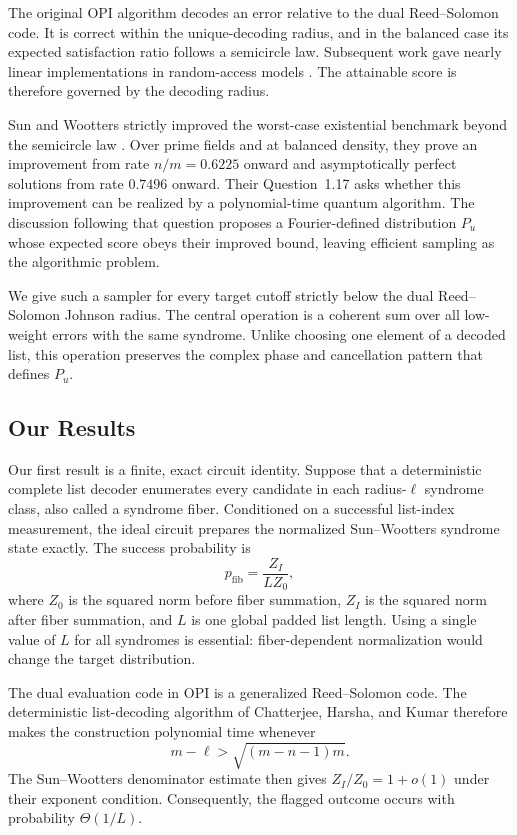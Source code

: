 \documentclass[11pt,letterpaper]{article}
\theoremstyle{definition}
\begin{document}
The original OPI algorithm decodes an error relative to the dual Reed--Solomon code.  It is correct within the unique-decoding radius, and in the balanced case its expected satisfaction ratio follows a semicircle law.  Subsequent work gave nearly linear implementations in random-access models \cite{KhattarEtAl2025,Rosmanis2026}.  The attainable score is therefore governed by the decoding radius.

Sun and Wootters strictly improved the worst-case existential benchmark beyond the semicircle law \cite{SunWootters2026}.  Over prime fields and at balanced density, they prove an improvement from rate $n/m=0.6225$ onward and asymptotically perfect solutions from rate $0.7496$ onward.  Their Question~1.17 asks whether this improvement can be realized by a polynomial-time quantum algorithm.  The discussion following that question proposes a Fourier-defined distribution $P_u$ whose expected score obeys their improved bound, leaving efficient sampling as the algorithmic problem.

We give such a sampler for every target cutoff strictly below the dual Reed--Solomon Johnson radius.  The central operation is a coherent sum over all low-weight errors with the same syndrome.  Unlike choosing one element of a decoded list, this operation preserves the complex phase and cancellation pattern that defines $P_u$.

\subsection{Our Results}

Our first result is a finite, exact circuit identity.  Suppose that a deterministic complete list decoder enumerates every candidate in each radius-$\ell$ syndrome class, also called a syndrome fiber.  Conditioned on a successful list-index measurement, the ideal circuit prepares the normalized Sun--Wootters syndrome state exactly.  The success probability is
\[
   p_{\mathrm{fib}}=\frac{Z_I}{LZ_0},
\]
where $Z_0$ is the squared norm before fiber summation, $Z_I$ is the squared norm after fiber summation, and $L$ is one global padded list length.  Using a single value of $L$ for all syndromes is essential: fiber-dependent normalization would change the target distribution.

The dual evaluation code in OPI is a generalized Reed--Solomon code.  The deterministic list-decoding algorithm of Chatterjee, Harsha, and Kumar \cite{ChatterjeeEtAl2026} therefore makes the construction polynomial time whenever
\begin{equation}
   m-\ell>\sqrt{(m-n-1)m}.
   \label{eq:intro-johnson}
\end{equation}
The Sun--Wootters denominator estimate then gives $Z_I/Z_0=1+o(1)$ under their exponent condition.  Consequently, the flagged outcome occurs with probability $\Theta(1/L)$.
\end{document}
